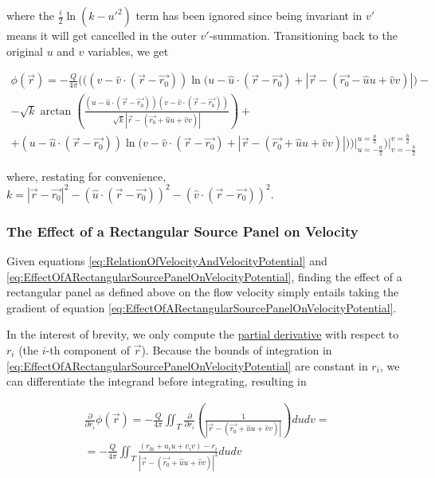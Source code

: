 ﻿\documentclass{article}
\begin{document}
where the $\frac{i}{2} \ln(k - u'^2)$ term has been ignored since being invariant in $v'$ means it will get cancelled in the outer $v'$-summation. Transitioning back to the original $u$ and $v$ variables, we get

\begin{multline}
    \label{eq:SolutionToTheEquationForTheEffectOfARectangularSourcePanelOnTheVelocityPotential}
    \phi(\vec{r}) = - \frac{Q}{4 \pi} \Bigg( \bigg( (v - \hat{v} \cdot (\vec{r} - \vec{r_0})) \ln \big( u - \hat{u} \cdot (\vec{r} - \vec{r_0}) + |\vec{r} - (\vec{r_0} - \hat{u} u + \hat{v} v)| \big) - \\ 
    - \sqrt{k} \arctan \left( \frac{(u - \hat{u} \cdot (\vec{r} - \vec{r_0})) (v - \hat{v} \cdot (\vec{r} - \vec{r_0}))}{\sqrt{k} |\vec{r} - (\vec{r_0} + \hat{u} u + \hat{v} v)|} \right) + \\
    + (u - \hat{u} \cdot (\vec{r} - \vec{r_0})) \ln \big( v - \hat{v} \cdot (\vec{r} - \vec{r_0}) + |\vec{r} - (\vec{r_0} + \hat{u} u + \hat{v} v)| \big) \bigg) \bigg|_{u = - \frac{a}{2}}^{u = \frac{a}{2}} \Bigg) \bigg|_{v = - \frac{b}{2}}^{v = \frac{b}{2}}
\end{multline}

where, restating for convenience, $k = |\vec{r} - \vec{r_0}|^2 - (\hat{u} \cdot (\vec{r} - \vec{r_0}))^2 - (\hat{v} \cdot (\vec{r} - \vec{r_0}))^2$.

\subsubsection{The Effect of a Rectangular Source Panel on Velocity}

Given equations \ref{eq:RelationOfVelocityAndVelocityPotential} and \ref{eq:EffectOfARectangularSourcePanelOnVelocityPotential}, finding the effect of a rectangular panel as defined above on the flow velocity simply entails taking the gradient of equation \ref{eq:EffectOfARectangularSourcePanelOnVelocityPotential}.

In the interest of brevity, we only compute the \href{https://en.wikipedia.org/wiki/Partial_derivative}{partial derivative} with respect to $r_i$ (the $i$-th component of $\vec{r}$). Because the bounds of integration in \ref{eq:EffectOfARectangularSourcePanelOnVelocityPotential} are constant in $r_i$, we can differentiate the integrand before integrating, resulting in

\begin{multline*}
    \frac{\partial}{\partial r_i} \phi(\vec{r}) = - \frac{Q}{4 \pi} \iint_T \frac{\partial}{\partial r_i} \left( \frac{1}{|\vec{r} - (\vec{r_0} + \hat{u} u + \hat{v} v)|} \right) du dv = \\
    = - \frac{Q}{4 \pi} \iint_T \frac{(r_{0i} + u_i u + v_i v) - r_i}{|\vec{r} - (\vec{r_0} + \hat{u} u + \hat{v} v)|^3} du dv
\end{multline*}
\end{document}

